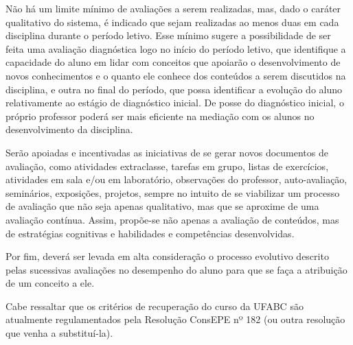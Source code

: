 Não há um limite mínimo de avaliações a serem realizadas, mas, dado o caráter
qualitativo do sistema, é indicado que sejam realizadas ao menos duas em cada
disciplina durante o período letivo.
Esse mínimo sugere a possibilidade de ser feita uma avaliação diagnóstica logo
no início do período letivo, que identifique a capacidade do aluno em lidar com
conceitos que apoiarão o desenvolvimento de novos conhecimentos e o quanto ele
conhece dos conteúdos a serem discutidos na disciplina, e outra no final do
período, que possa identificar a evolução do aluno relativamente ao estágio de
diagnóstico inicial. 
De posse do diagnóstico inicial, o próprio professor poderá ser mais eficiente
na mediação com os alunos no desenvolvimento da disciplina. 

Serão apoiadas e incentivadas as iniciativas de se gerar novos documentos de
avaliação, como atividades extraclasse, tarefas em grupo, listas de exercícios,
atividades em sala e/ou em laboratório, observações do professor,
auto-avaliação, seminários, exposições, projetos, sempre no intuito de se
viabilizar um processo de avaliação que não seja apenas qualitativo, mas que se
aproxime de uma avaliação contínua.
Assim, propõe-se não apenas a avaliação de conteúdos, mas de estratégias
cognitivas e habilidades e competências desenvolvidas. 

Por fim, deverá ser levada em alta consideração o processo evolutivo descrito
pelas sucessivas avaliações no desempenho do aluno para que se faça a
atribuição de um conceito a ele.

Cabe ressaltar que os critérios de recuperação do curso da UFABC são atualmente
regulamentados pela Resolução ConsEPE nº 182 (ou outra resolução que venha a
substituí-la).




